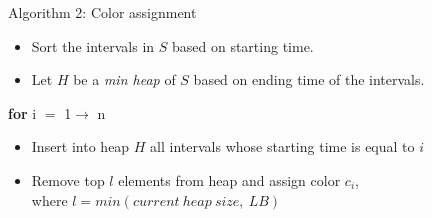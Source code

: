 
\begin{frame}{Algorithm 2: Color assignment}
\begin{itemize}
\item Sort the intervals in $S$ based on starting time.
\item Let $H$ be a {\em min heap} of $S$ based on ending time of the intervals.
\end{itemize}

\begin{block}{}
{\bf for} i $=$ 1$\rightarrow$ n\\
\begin{itemize}
\item Insert into heap $H$ all intervals whose starting time is equal to $i$
\item Remove top $l$ elements from heap and assign color $c_i$, \\
where $l=min(current\ heap\ size,\ LB)$ \\
\end{itemize}
\end{block}
\end{frame}
